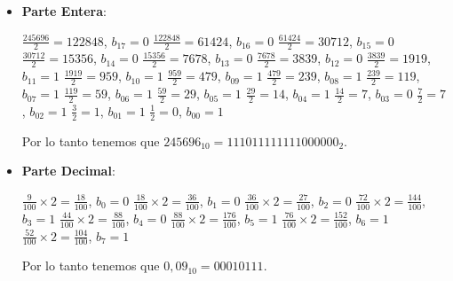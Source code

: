 \documentclass{article}
\begin{document}
\begin{itemize}
	\item \textbf{Parte Entera}:
	\begin{multicols}{2}
		$\frac{245696}{2} = 122848$, $b_{17} = 0$ \newline
		$\frac{122848}{2} = 61424$, $b_{16} = 0$ \newline
		$\frac{61424}{2} = 30712$, $b_{15} = 0$ \newline
		$\frac{30712}{2} = 15356$, $b_{14} = 0$ \newline
		$\frac{15356}{2} = 7678$, $b_{13} = 0$ \newline
		$\frac{7678}{2} = 3839$, $b_{12} = 0$ \newline
		$\frac{3839}{2} = 1919$, $b_{11} = 1$ \newline
		$\frac{1919}{2} = 959$, $b_{10} = 1$ \newline
		$\frac{959}{2} = 479$, $b_{09} = 1$ \newline
		$\frac{479}{2} = 239$, $b_{08} = 1$ \newline
		$\frac{239}{2} = 119$, $b_{07} = 1$ \newline
		$\frac{119}{2} = 59$, $b_{06} = 1$ \newline
		$\frac{59}{2} = 29$, $b_{05} = 1$ \newline
		$\frac{29}{2} = 14$, $b_{04} = 1$ \newline
		$\frac{14}{2} = 7$, $b_{03} = 0$ \newline
		$\frac{7}{2} = 7$, $b_{02} = 1$ \newline
		$\frac{3}{2} = 1$, $b_{01} = 1$ \newline
		$\frac{1}{2} = 0$, $b_{00} = 1$ \newline
	\end{multicols}
	Por lo tanto tenemos que $245696_{10} = 111011111111000000_{2}$.
	
	\item \textbf{Parte Decimal}:
	\begin{multicols}{2}
		$\frac{9}{100} \times 2 = \frac{18}{100}$, $b_{0} = 0$ \newline
		$\frac{18}{100} \times 2 = \frac{36}{100}$, $b_{1} = 0$ \newline
		$\frac{36}{100} \times 2 = \frac{27}{100}$, $b_{2} = 0$ \newline
		$\frac{72}{100} \times 2 = \frac{144}{100}$, $b_{3} = 1$ \newline
		$\frac{44}{100} \times 2 = \frac{88}{100}$, $b_{4} = 0$ \newline
		$\frac{88}{100} \times 2 = \frac{176}{100}$, $b_{5} = 1$ \newline
		$\frac{76}{100} \times 2 = \frac{152}{100}$, $b_{6} = 1$ \newline
		$\frac{52}{100} \times 2 = \frac{104}{100}$, $b_{7} = 1$ \newline
	\end{multicols}
	Por lo tanto tenemos que $0,09_{10} = 00010111$.
\end{itemize}
\end{document}
